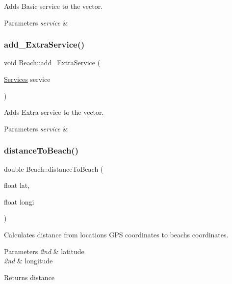 Adds Basic service to the vector. 


\begin{DoxyParams}{Parameters}
{\em service} & \\
\hline
\end{DoxyParams}
\mbox{\label{class_beach_a9182c63f32af1afd95649f14077c820c}} 
\subsubsection{\texorpdfstring{add\+\_\+\+Extra\+Service()}{add\_ExtraService()}}
{\footnotesize\ttfamily void Beach\+::add\+\_\+\+Extra\+Service (\begin{DoxyParamCaption}\item[{\hyperlink{class_services}{Services}}]{service }\end{DoxyParamCaption})}



Adds Extra service to the vector. 


\begin{DoxyParams}{Parameters}
{\em service} & \\
\hline
\end{DoxyParams}
\mbox{\label{class_beach_a4b7774165afd3ae88952281b9d846865}} 
\subsubsection{\texorpdfstring{distance\+To\+Beach()}{distanceToBeach()}}
{\footnotesize\ttfamily double Beach\+::distance\+To\+Beach (\begin{DoxyParamCaption}\item[{float}]{lat,  }\item[{float}]{longi }\end{DoxyParamCaption})}



Calculates distance from location\textquotesingle{}s G\+PS coordinates to beach\textquotesingle{}s coordinates. 


\begin{DoxyParams}{Parameters}
{\em 2nd} & latitude \\
\hline
{\em 2nd} & longitude \\
\hline
\end{DoxyParams}
\begin{DoxyReturn}{Returns}
distance 
\end{DoxyReturn}
\mbox{\label{class_beach_aa22b4abddf590bef4ff426f28866aca0}} 
